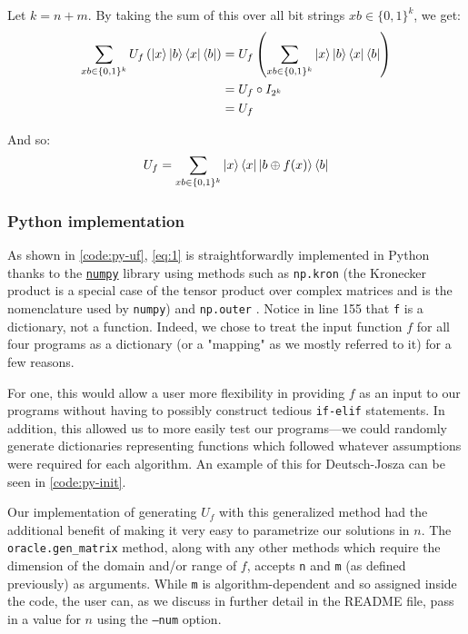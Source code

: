 \documentclass[12pt]{article}
\begin{document}
Let $k = n+m$. By taking the sum of this over all bit strings $xb \in \{0,1\}^k$, we get:
\begin{align*}
    \sum_{xb \in \{0,1\}^{k}}U_f\left(\ket{x}\ket{b}\bra{x}\bra{b}\right)
        &= U_f \left(\sum_{xb \in \{0,1\}^{k}}\ket{x}\ket{b}\bra{x}\bra{b}\right) \\
        &= U_f \circ I_{2^{k}} \\
        &= U_f
\end{align*}

And so:
\begin{equation}\label{eq:1}
        U_f = \sum_{xb \in \{0,1\}^{k}}\ket{x}\bra{x} \ket{b \oplus f(x)}\bra{b}
\end{equation}

\subsubsection{Python implementation}

As shown in \autoref{code:py-uf}, \autoref{eq:1} is straightforwardly implemented in Python thanks to the \href{https://numpy.org/}{\texttt{numpy}} library using methods such as \texttt{np.kron} (the Kronecker product is a special case of the tensor product over complex matrices and is the nomenclature used by \texttt{numpy}) and \texttt{np.outer} \cite{numpy}.
Notice in line 155 that \texttt{f} is a dictionary, not a function.
Indeed, we chose to treat the input function $f$ for all four programs as a dictionary (or a "mapping" as we mostly referred to it) for a few reasons.

For one, this would allow a user more flexibility in providing $f$ as an input to our programs without having to possibly construct tedious \texttt{if-elif} statements.
In addition, this allowed us to more easily test our programs---we could randomly generate dictionaries representing functions which followed whatever assumptions were required for each algorithm.
An example of this for Deutsch-Josza can be seen in \autoref{code:py-init}.

Our implementation of generating $U_f$ with this generalized method had the additional benefit of making it very easy to parametrize our solutions in $n$.
The \texttt{oracle.gen\_matrix} method, along with any other methods which require the dimension of the domain and/or range of $f$, accepts \texttt{n} and \texttt{m} (as defined previously) as arguments.
While \texttt{m} is algorithm-dependent and so assigned inside the code, the user can, as we discuss in further detail in the README file, pass in a value for $n$ using the \texttt{--num} option.
\end{document}
